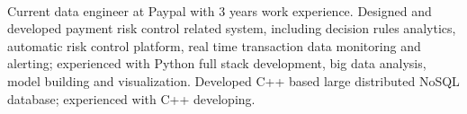 \documentclass[11pt, a4paper, UTF8]{awesome-cv}
\begin{document}
\makecvheader[R]

\makecvfooter
  {\ }
  {\ }
  {\ }




\begin{cvparagraph}
Current data engineer at Paypal with 3 years work experience. Designed and developed payment risk control related system, including decision rules analytics, automatic risk control platform, real time transaction data monitoring and alerting; experienced with Python full stack development, big data analysis, model building and visualization. Developed C++ based large distributed NoSQL database; experienced with C++ developing.
\end{cvparagraph}
\end{document}
